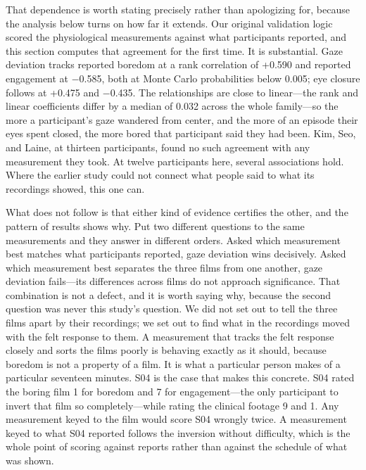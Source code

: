 That dependence is worth stating precisely rather than apologizing for, because the analysis
below turns on how far it extends. Our original validation logic scored the physiological
measurements against what participants reported, and this section computes that agreement for
the first time. It is substantial. Gaze deviation tracks reported boredom at a rank correlation
of +0.590 and reported engagement at $-$0.585, both at Monte Carlo probabilities below 0.005;
eye closure follows at +0.475 and $-$0.435. The relationships are close to linear---the rank and
linear coefficients differ by a median of 0.032 across the whole family---so the more a
participant's gaze wandered from center, and the more of an episode their eyes spent closed, the
more bored that participant said they had been. Kim, Seo, and Laine, at thirteen participants,
found no such agreement with any measurement they took. At twelve participants here, several
associations hold. Where the earlier study could not connect what people said to what its
recordings showed, this one can.

What does not follow is that either kind of evidence certifies the other, and the pattern of
results shows why. Put two different questions to the same measurements and they answer in
different orders. Asked which measurement best matches what participants reported, gaze
deviation wins decisively. Asked which measurement best separates the three films from one
another, gaze deviation fails---its differences across films do not approach significance.
That combination is not a defect, and it is worth saying why, because the second question was
never this study's question. We did not set out to tell the three films apart by their
recordings; we set out to find what in the recordings moved with the felt response to them. A
measurement that tracks the felt response closely and sorts the films poorly is behaving
exactly as it should, because boredom is not a property of a film. It is what a particular
person makes of a particular seventeen minutes. S04 is the case that makes this concrete. S04
rated the boring film 1 for boredom and 7 for engagement---the only participant to invert that
film so completely---while rating the clinical footage 9 and 1. Any measurement keyed to the
film would score S04 wrongly twice. A measurement keyed to what S04 reported follows the
inversion without difficulty, which is the whole point of scoring against reports rather than
against the schedule of what was shown.


